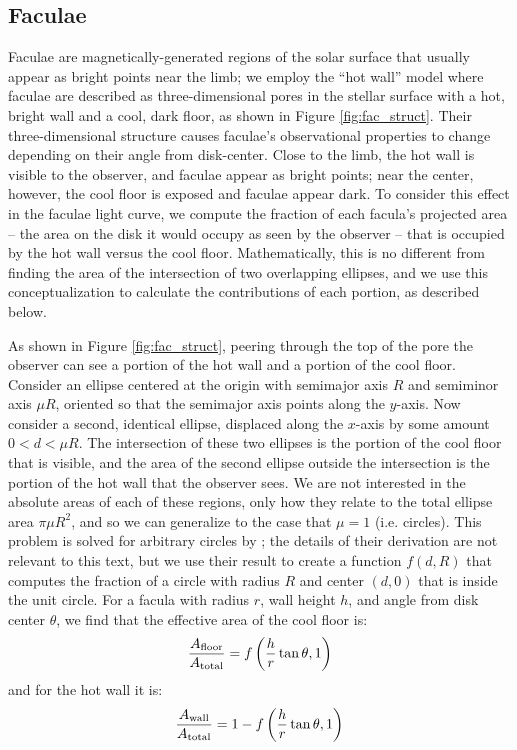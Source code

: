 \documentclass[twocolumn,linenumbers]{aastex631}
\begin{document}
\subsection{Faculae \label{subsec:faculae}}
Faculae are magnetically-generated regions of the solar surface that usually appear as bright points near the limb; we employ the ``hot wall''
model \citep{spruit1976} where faculae are described as three-dimensional pores in the stellar surface with a hot, bright wall and a cool, dark floor, as shown in Figure \ref{fig:fac_struct}. Their three-dimensional structure causes faculae's observational properties to change depending on their angle from disk-center. Close to the limb,
the hot wall is visible to the observer, and faculae appear as bright points; near the center, however, the cool floor is exposed and faculae appear dark. To consider this effect in the faculae light curve, we compute the fraction of each facula's projected area -- the area on the disk it would occupy as seen by the observer -- that is occupied by the hot wall versus the cool floor. Mathematically, this is no different from finding the area of the intersection of two overlapping ellipses, and we use this conceptualization to calculate the contributions of each portion, as described below.

As shown in Figure \ref{fig:fac_struct}, peering through the top of the pore the observer can see a portion of the hot wall and a portion of the cool floor. Consider an ellipse centered at the origin with semimajor axis $R$ and semiminor axis $\mu R$, oriented so that the semimajor axis points along the $y$-axis. Now consider a second, identical ellipse, displaced along the $x$-axis by some amount $0<d<\mu R$. The intersection of these two ellipses is the portion of the cool floor that is visible, and the area of the second ellipse outside the intersection is the portion of the hot wall that the observer sees. We are not interested in the absolute areas of each of these regions, only how they relate to the total ellipse area $\pi \mu R^2$, and so we can generalize to the case that $\mu=1$ (i.e. circles). This problem is solved for arbitrary circles by \citet{weisstein2004}; the details of their derivation are not relevant to this text, but we use their result to create a function $f(d,R)$ that computes the fraction of a circle with radius $R$ and center $(d,0)$ that is inside the unit circle. For a facula with radius $r$, wall height $h$, and angle from disk center $\theta$, we find that the effective area of the cool floor is:
\begin{equation}
    \frac{A_{\rm floor}}{A_{\rm total}} = f\left(\frac{h}{r}\tan{\theta}, 1 \right)
\end{equation}
and for the hot wall it is:
\begin{equation}
    \frac{A_{\rm wall}}{A_{\rm total}} = 1-  f\left(\frac{h}{r}\tan{\theta}, 1 \right)
\end{equation}
\end{document}
